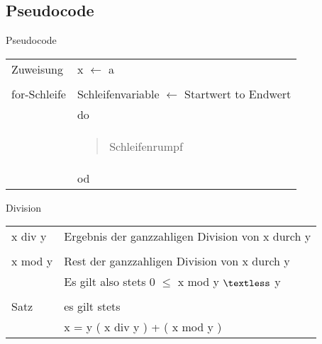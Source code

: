 \documentclass{beamer}
\begin{document}
\subsection{Pseudocode}
\begin{frame}
	\begin{block}{Pseudocode}
		\begin{tabular}[c]{ll}
		Zuweisung & x $\leftarrow$ a \\
		&\\
		for-Schleife & Schleifenvariable $\leftarrow$ Startwert to Endwert \\
		& do \\
		& \begin{quote} Schleifenrumpf \end{quote}\\
		& od \\
		\end{tabular}
	\end{block}
\end{frame}

\begin{frame}
	\begin{block}{Division}
		\begin{tabular}[c]{ll}
		x div y & Ergebnis der ganzzahligen Division von x durch y \\
		&\\
		x mod y & Rest der ganzzahligen Division von x durch y \\
		& Es gilt also stets 0 $\leq $ x mod y $\textless $ y \\
		&\\
		Satz & es gilt stets \\
		& x = y ( x div y ) + ( x mod y ) \\
		\end{tabular}
	\end{block}
\end{frame}
\end{document}
